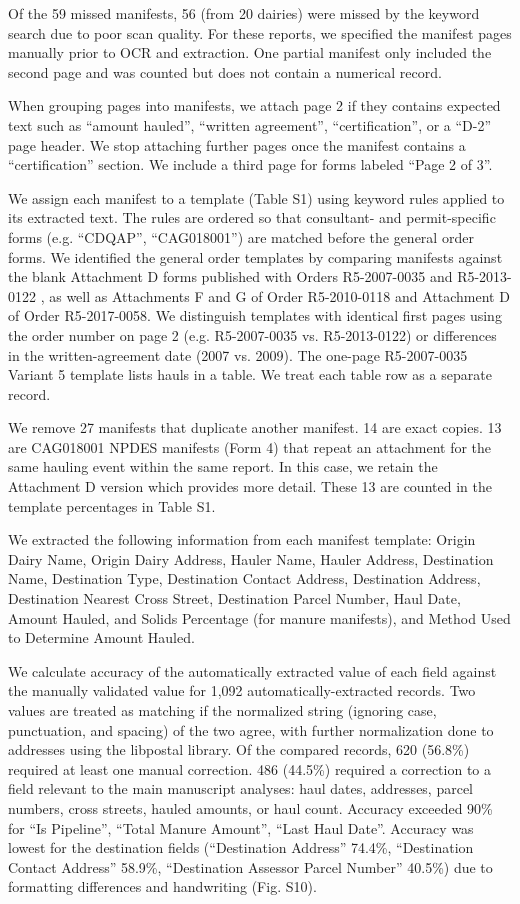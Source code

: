 \documentclass{iopjournal}
\begin{document}
Of the 59 missed manifests, 56 (from 20 dairies) were missed by the keyword search due to poor scan quality. For these reports, we specified the manifest pages manually prior to OCR and extraction. One partial manifest only included the second page and was counted but does not contain a numerical record.

When grouping pages into manifests, we attach page 2 if they contains expected text such as ``amount hauled'', ``written agreement'', ``certification'', or a ``D-2'' page header. We stop attaching further pages once the manifest contains a ``certification'' section. We include a third page for forms labeled ``Page 2 of 3''.

We assign each manifest to a template (Table S1) using keyword rules applied to its extracted text. The rules are ordered so that consultant- and permit-specific forms (e.g. ``CDQAP'', ``CAG018001'') are matched before the general order forms. We identified the general order templates by comparing manifests against the blank Attachment D forms published with Orders R5-2007-0035 \cite{Dairy_Order_2007} and R5-2013-0122 \cite{CVRWQCB_2013_Order}, as well as Attachments F and G of Order R5-2010-0118 and Attachment D of Order R5-2017-0058. We distinguish templates with identical first pages using the order number on page 2 (e.g. R5-2007-0035 vs. R5-2013-0122) or differences in the written-agreement date (2007 vs. 2009). The one-page R5-2007-0035 Variant 5 template lists hauls in a table. We treat each table row as a separate record.

We remove 27 manifests that duplicate another manifest. 14 are exact copies. 13 are CAG018001 NPDES manifests (Form 4) that repeat an attachment for the same hauling event within the same report. In this case, we retain the Attachment D version which provides more detail. These 13 are counted in the template percentages in Table S1.

We extracted the following information from each manifest template: Origin Dairy Name, Origin Dairy Address, Hauler Name, Hauler Address, Destination Name, Destination Type, Destination Contact Address, Destination Address, Destination Nearest Cross Street, Destination Parcel Number, Haul Date, Amount Hauled, and Solids Percentage (for manure manifests), and Method Used to Determine Amount Hauled. 

We calculate accuracy of the automatically extracted value of each field against the manually validated value for 1,092 automatically-extracted records. Two values are treated as matching if the normalized string (ignoring case, punctuation, and spacing) of the two agree, with further normalization done to addresses using the libpostal library. Of the compared records, 620 (56.8\%) required at least one manual correction. 486 (44.5\%) required a correction to a field relevant to the main manuscript analyses: haul dates, addresses, parcel numbers, cross streets, hauled amounts, or haul count. Accuracy exceeded 90\% for ``Is Pipeline'', ``Total Manure Amount'', ``Last Haul Date''. Accuracy was lowest for the destination fields (``Destination Address'' 74.4\%, ``Destination Contact Address'' 58.9\%, ``Destination Assessor Parcel Number'' 40.5\%) due to formatting differences and handwriting (Fig. S10).
\end{document}

